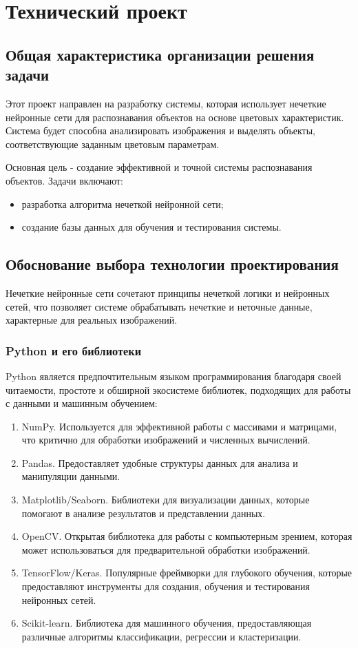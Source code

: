 \section{Технический проект}
\subsection{Общая характеристика организации решения задачи}

Этот проект направлен на разработку системы, которая использует нечеткие нейронные сети для распознавания объектов на основе цветовых характеристик. Система будет способна анализировать изображения и выделять объекты, соответствующие заданным цветовым параметрам.

Основная цель - создание эффективной и точной системы распознавания объектов. Задачи включают:

\begin{itemize}
\item разработка алгоритма нечеткой нейронной сети;
\item создание базы данных для обучения и тестирования системы.
\end{itemize}

\subsection{Обоснование выбора технологии проектирования}

Нечеткие нейронные сети сочетают принципы нечеткой логики и нейронных сетей, что позволяет системе обрабатывать нечеткие и неточные данные, характерные для реальных изображений.

\subsubsection{Python и его библиотеки}

Python является предпочтительным языком программирования благодаря своей читаемости, простоте и обширной экосистеме библиотек, подходящих для работы с данными и машинным обучением:

\begin{enumerate}
\item NumPy. Используется для эффективной работы с массивами и матрицами, что критично для обработки изображений и численных вычислений.
\item Pandas. Предоставляет удобные структуры данных для анализа и манипуляции данными.
\item Matplotlib/Seaborn. Библиотеки для визуализации данных, которые помогают в анализе результатов и представлении данных.
\item OpenCV. Открытая библиотека для работы с компьютерным зрением, которая может использоваться для предварительной обработки изображений.
\item TensorFlow/Keras. Популярные фреймворки для глубокого обучения, которые предоставляют инструменты для создания, обучения и тестирования нейронных сетей.
\item Scikit-learn. Библиотека для машинного обучения, предоставляющая различные алгоритмы классификации, регрессии и кластеризации.
\end{enumerate}

